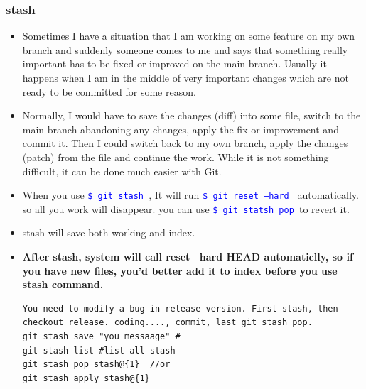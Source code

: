 \documentclass[a4paper,11pt,twoside]{book}
\newcommand{\linuxcommand}[1]{\texttt{\textcolor{blue}{\$ #1 \Pisymbol{psy}{191}}}}
\begin{document}
\subsubsection{stash}
\begin{itemize}
	\item Sometimes I have a situation that I am working on some feature on my own branch and suddenly someone comes to me and says that something really important has to be fixed or improved on the main branch. Usually it happens when I am in the middle of very important changes which are not ready to be committed for some reason. 
	
	\item Normally, I would have to save the changes (diff) into some file, switch to the main branch abandoning any changes, apply the fix or improvement and commit it. Then I could switch back to my own branch, apply the changes (patch) from the file and continue the work. While it is not something difficult, it can be done much easier with Git.
	
	\item When you use \linuxcommand{git stash}, It will run \linuxcommand{git reset --hard} automatically. so all you work will disappear. you can use \linuxcommand{git statsh pop }to revert it.
	\item stash will save both working and index.
	\item \textbf{After stash, system will call reset --hard HEAD automaticlly, so if you have new files, you'd better add it to index before you use stash command.}
\begin{verbatim}
You need to modify a bug in release version. First stash, then checkout release. coding...., commit, last git stash pop.
git stash save "you messaage" #
git stash list #list all stash
git stash pop stash@{1}  //or
git stash apply stash@{1} 		
\end{verbatim}
	
\end{itemize}
\end{document}
